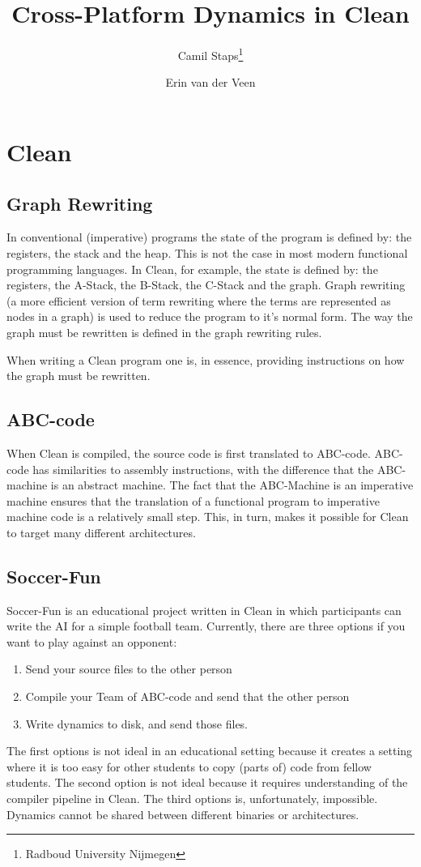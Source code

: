 \documentclass[a4paper]{article}
\title{Cross-Platform Dynamics in Clean}
\author{Camil Staps\footnote{Radboud University Nijmegen} \and Erin van der Veen\footnotemark[1]}
\begin{document}
\maketitle

\section{Clean}
\subsection{Graph Rewriting}
In conventional (imperative) programs the state of the program is defined by: the registers, the stack and the heap.
This is not the case in most modern functional programming languages.
In Clean, for example, the state is defined by: the registers, the A-Stack, the B-Stack, the C-Stack and the graph.
Graph rewriting (a more efficient version of term rewriting where the terms are represented as nodes in a graph) is used to reduce the program to it's normal form.
The way the graph must be rewritten is defined in the graph rewriting rules.

When writing a Clean program one is, in essence, providing instructions on how the graph must be rewritten.

\subsection{ABC-code}
When Clean is compiled, the source code is first translated to ABC-code.
ABC-code has similarities to assembly instructions, with the difference that the ABC-machine is an abstract machine.
The fact that the ABC-Machine is an imperative machine ensures that the translation of a functional program to imperative machine code is a relatively small step.
This, in turn, makes it possible for Clean to target many different architectures.

\subsection{Soccer-Fun}
Soccer-Fun is an educational project written in Clean in which participants can write the AI for a simple football team.
Currently, there are three options if you want to play against an opponent:
\begin{enumerate}
	\item Send your source files to the other person
	\item Compile your Team of ABC-code and send that the other person
	\item Write dynamics to disk, and send those files.
\end{enumerate}
The first options is not ideal in an educational setting because it creates a setting where it is too easy for other students to copy (parts of) code from fellow students.
The second option is not ideal because it requires understanding of the compiler pipeline in Clean.
The third options is, unfortunately, impossible.
Dynamics cannot be shared between different binaries or architectures.
\end{document}
